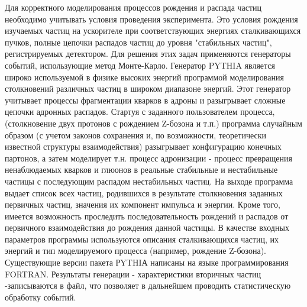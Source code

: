 Для корректного моделирования процессов рождения и распада частиц необходимо учитывать условия проведения эксперимента. Это условия рождения изучаемых частиц на ускорителе при соответствующих энергиях сталкивающихся пучков, полные цепочки распадов частиц до уровня "стабильных частиц", регистрируемых детектором. Для решения этих задач применяются генераторы событий, использующие метод Монте-Карло.
Генератор PYTHIA является широко используемой в физике высоких энергий программой моделирования столкновений различных частиц в широком диапазоне энергий. Этот генератор учитывает процессы фрагментации кварков в адроны и разыгрывает сложные цепочки адронных распадов. Стартуя с заданного пользователем процесса, (столкновение двух протонов с рождением Z-бозона и т.п.) программа случайным образом (с учетом законов сохранения и, по возможности, теоретически известной структуры взаимодействия) разыгрывает конфигурацию конечных партонов, а затем моделирует т.н. процесс адронизации - процесс превращения ненаблюдаемых кварков и глюонов в реальные стабильные и нестабильные частицы с последующим распадом нестабильных частиц. На выходе программа выдает список всех частиц, родившихся в результате столкновения заданных первичных частиц, значения их компонент импульса и энергии. Кроме того, имеется возможность проследить последовательность рождений и распадов от первичного взаимодействия до рождения данной частицы. В качестве входных параметров программы используются описания сталкивающихся частиц, их энергий и тип моделируемого процесса (например, рождение Z-бозона). Существующие версии пакета РYTHIА написаны на языке программирования FORTRAN.
Результаты генерации - характеристики вторичных частиц -записываются в файл, что позволяет в дальнейшем проводить статистическую обработку событий.